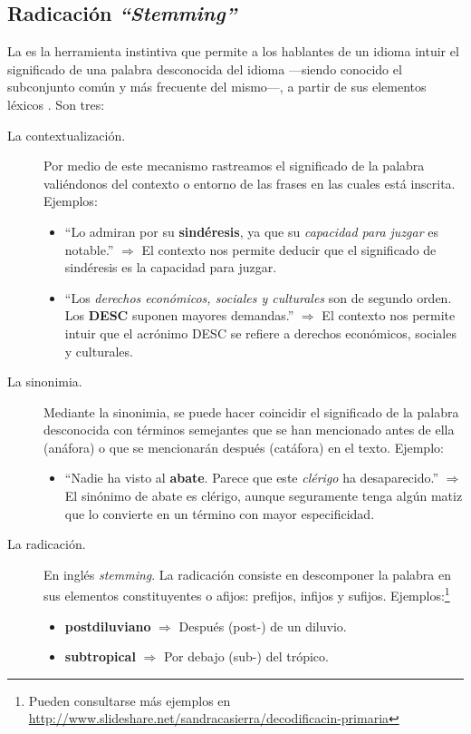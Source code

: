 \subsection{Radicación \emph{``Stemming''}}

La  es la herramienta instintiva que permite a los hablantes de un idioma intuir el significado de una palabra desconocida del idioma ---siendo conocido el subconjunto común y más frecuente del mismo---, a partir de sus elementos léxicos \citep{Zubira2002}. Son tres:
\nopagebreak
\begin{description}
\item[La contextualización.] Por medio de este mecanismo rastreamos el significado de la palabra valiéndonos del contexto o entorno de las frases en las cuales está inscrita. Ejemplos:
\nopagebreak
\begin{itemize}
\item ``Lo admiran por su \textbf{sindéresis}, ya que su \emph{capacidad para juzgar} es notable.'' $\Longrightarrow$ El contexto nos permite deducir que el significado de sindéresis es la capacidad para juzgar.
\item ``Los \emph{derechos económicos, sociales y culturales} son de segundo orden. Los \textbf{DESC} suponen mayores demandas.'' $\Longrightarrow$ El contexto nos permite intuir que el acrónimo DESC se refiere a derechos económicos, sociales y culturales.
\end{itemize}
%
\item[La sinonimia.] Mediante la sinonimia, se puede hacer coincidir el significado de la palabra desconocida con términos semejantes que se han mencionado antes de ella (anáfora) o que se mencionarán después (catáfora) en el texto. Ejemplo:
\nopagebreak
\begin{itemize}
\item ``Nadie ha visto al \textbf{abate}. Parece que este \emph{clérigo} ha desaparecido.'' $\Longrightarrow$ El sinónimo de abate es clérigo, aunque seguramente tenga algún matiz que lo convierte en un término con mayor especificidad.
\end{itemize}
%
\item[La radicación.] En inglés \emph{stemming}. La radicación consiste en descomponer la palabra en sus elementos constituyentes o afijos: prefijos, infijos y sufijos. Ejemplos:\footnote{Pueden consultarse más ejemplos en \url{http://www.slideshare.net/sandracasierra/decodificacin-primaria}}
\nopagebreak
\begin{itemize}
\item \textbf{postdiluviano} $\Longrightarrow$ Después (post-) de un diluvio.
\item \textbf{subtropical}  $\Longrightarrow$ Por debajo (sub-) del trópico.
\end{itemize}
\end{description}

